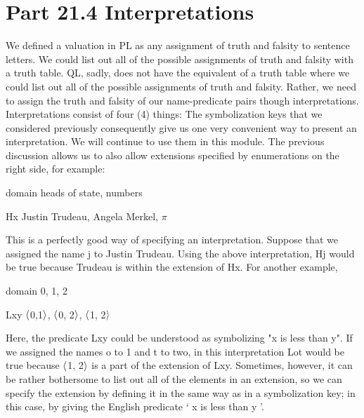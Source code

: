 \section{Part 21.4 Interpretations}
We defined a valuation in PL as any assignment of truth and falsity to sentence letters. We could list out all of the possible assignments of truth and falsity with a truth table. QL, sadly, does not have the equivalent of a truth table where we could list out all of the possible assignments of truth and falsity. Rather, we need to assign the truth and falsity of our name-predicate pairs though interpretations. Interpretations consist of four (4) things:
The symbolization keys that we considered previously consequently give us one very convenient way to present an interpretation. We will continue to use them in this module. The previous discussion allows us to also allow extensions specified by enumerations on the right side, for example:
\begin{ekey}
\item[domain] heads of state, numbers
\item[Hx] Justin Trudeau, Angela Merkel, $\pi$
\end{ekey}
This is a perfectly good way of specifying an interpretation. Suppose that we assigned the name j to Justin Trudeau. Using the above interpretation, Hj would be true because Trudeau is within the extension of Hx. For another example,
\begin{ekey}
\item[domain] 0, 1, 2
\item[Lxy] $\langle$0,1$\rangle$, $\langle$0, 2$\rangle$, $\langle$1, 2$\rangle$
\end{ekey}
Here, the predicate Lxy could be understood as symbolizing "x is less than y". If we assigned the names o to 1 and t to two, in this interpretation Lot would be true because $\langle$1, 2$\rangle$ is a part of the extension of Lxy. Sometimes, however, it can be rather bothersome to list out all of the elements in an extension, so we can specify the extension by defining it in the same way as in a symbolization key; in this case, by giving the English predicate ‘ x is less than y ’.

